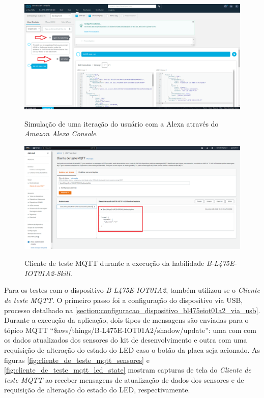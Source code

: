 \begin{figure}[htbp]
	\centering
	\caption{Simulação de uma iteração do usuário com a Alexa através do \textit{Amazon Alexa Console}.}
	\includegraphics[scale=0.315]{Imagens/alexa_developer_console.png}
	\label{fig:alexa_developer_console}
\end{figure}

\begin{figure}[htbp]
	\centering
	\caption{Cliente de teste MQTT durante a execução da habilidade \textit{B-L475E-IOT01A2-Skill}.}
	\includegraphics[scale=0.315]{Imagens/cliente_de_teste_mqtt.png}
	\label{fig:cliente_de_teste_mqtt}
\end{figure}

Para os testes com o dispositivo \textit{B-L475E-IOT01A2}, também utilizou-se o \textit{Cliente de teste MQTT}. O primeiro passo foi a configuração do dispositivo via USB, processo detalhado na \autoref{section:configuracao_dispositivo_bl475eiot01a2_via_usb}. Durante a execução da aplicação, dois tipos de mensagens são enviadas para o tópico MQTT ``\$aws/things/B-L475E-IOT01A2/shadow/update'': uma com com os dados atualizados dos sensores do kit de desenvolvimento e outra com uma requisição de alteração do estado do LED caso o botão da placa seja acionado. As figuras \autoref{fig:cliente_de_teste_mqtt_sensores} e \autoref{fig:cliente_de_teste_mqtt_led_state} mostram capturas de tela do \textit{Cliente de teste MQTT} ao receber mensagens de atualização de dados dos sensores e de requisição de alteração do estado do LED, respectivamente.


